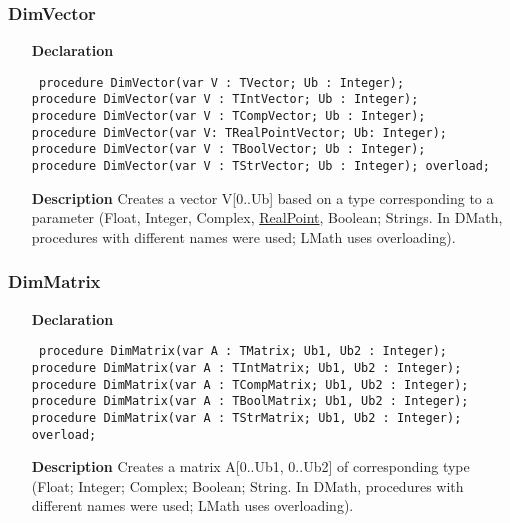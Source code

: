 \documentclass[12pt,a4paper,oneside]{report}
\newcommand{\lmath}[1]{   %
	\marginpar{\vspace{#1} 
		\begin{flushright}
			LMath
	\end{flushright} }
}
\newcommand{\declarationitem}[1]{\textbf{#1}}
\newcommand{\descriptiontitle}[1]{\textbf{#1}}
\newcommand{\code}[1]{\texttt{#1}}
\begin{document}
\subsubsection{DimVector}\lmath{-24pt}
\label{utypes-DimVector}
\begin{itemize}\item[\declarationitem{Declaration}\hfill]
	\begin{flushleft}
		\code{
			procedure DimVector(var V : TVector; Ub : Integer);\\
			procedure DimVector(var V : TIntVector; Ub : Integer);\\
			procedure DimVector(var V : TCompVector; Ub : Integer); \\
			procedure DimVector(var V: TRealPointVector; Ub: Integer); \\
			procedure DimVector(var V : TBoolVector; Ub : Integer); \\
			procedure DimVector(var V : TStrVector; Ub : Integer); overload;}
	\end{flushleft}
	\item[\descriptiontitle{Description}]
	Creates a vector V[0..Ub] based on a type corresponding to a parameter (Float, Integer, Complex, \hyperref[types:trealpoint]{RealPoint}, Boolean; Strings. In DMath, procedures with different names were used; LMath uses overloading).
\end{itemize}
\subsubsection{DimMatrix}\lmath{-24pt}
\label{utypes-DimMatrix}
\begin{itemize}\item[\declarationitem{Declaration}\hfill]
	\begin{flushleft}
		\code{
			procedure DimMatrix(var A : TMatrix; Ub1, Ub2 : Integer); \\
			procedure DimMatrix(var A : TIntMatrix; Ub1, Ub2 : Integer); \\
			procedure DimMatrix(var A : TCompMatrix; Ub1, Ub2 : Integer);\\
			procedure DimMatrix(var A : TBoolMatrix; Ub1, Ub2 : Integer); \\
			procedure DimMatrix(var A : TStrMatrix; Ub1, Ub2 : Integer); overload;}
	\end{flushleft}
	\item[\descriptiontitle{Description}]
	Creates a matrix A[0..Ub1, 0..Ub2] of corresponding type (Float; Integer; Complex; Boolean; String. In DMath, procedures with different names were used; LMath uses overloading).
\end{itemize}
\end{document}
